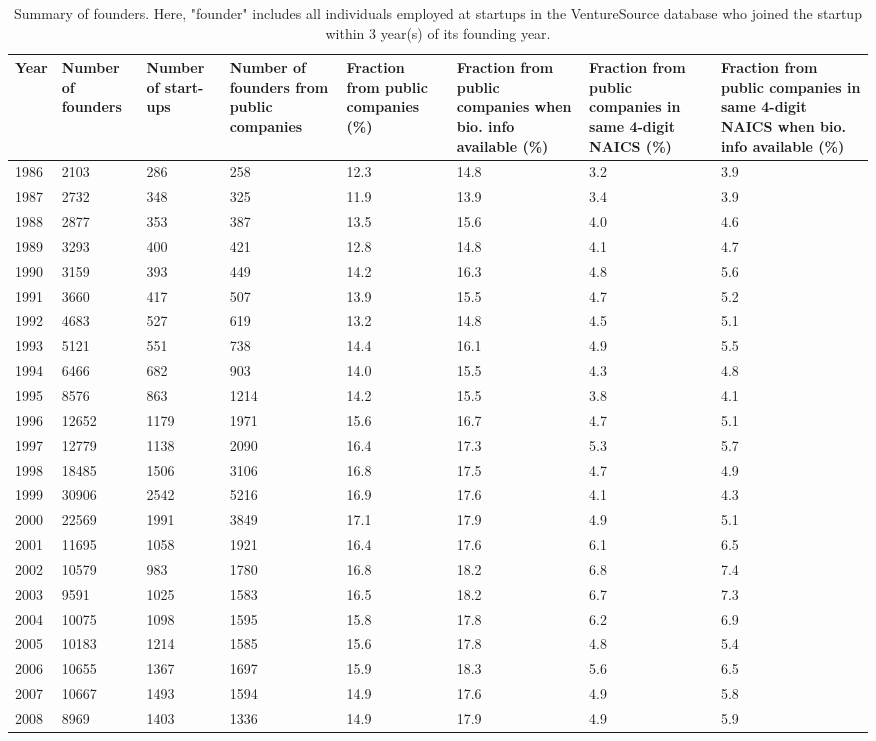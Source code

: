 \begin{table}[!htb]
\centering
\begingroup\scriptsize
\begin{tabular}{p{1.75cm}p{1.75cm}p{1.75cm}p{1.75cm}p{1.75cm}p{1.75cm}p{1.75cm}p{1.75cm}}
  \toprule
Year & Number of founders & Number of start-ups & Number of founders from public companies & Fraction from public companies (\%) & Fraction from public companies when bio. info available (\%) & Fraction from public companies in same 4-digit NAICS (\%) & Fraction from public companies in same 4-digit NAICS when bio. info available (\%) \\ 
  \midrule
1986 & 2103 & 286 & 258 & 12.3 & 14.8 & 3.2 & 3.9 \\ 
  1987 & 2732 & 348 & 325 & 11.9 & 13.9 & 3.4 & 3.9 \\ 
  1988 & 2877 & 353 & 387 & 13.5 & 15.6 & 4.0 & 4.6 \\ 
  1989 & 3293 & 400 & 421 & 12.8 & 14.8 & 4.1 & 4.7 \\ 
  1990 & 3159 & 393 & 449 & 14.2 & 16.3 & 4.8 & 5.6 \\ 
  1991 & 3660 & 417 & 507 & 13.9 & 15.5 & 4.7 & 5.2 \\ 
  1992 & 4683 & 527 & 619 & 13.2 & 14.8 & 4.5 & 5.1 \\ 
  1993 & 5121 & 551 & 738 & 14.4 & 16.1 & 4.9 & 5.5 \\ 
  1994 & 6466 & 682 & 903 & 14.0 & 15.5 & 4.3 & 4.8 \\ 
  1995 & 8576 & 863 & 1214 & 14.2 & 15.5 & 3.8 & 4.1 \\ 
  1996 & 12652 & 1179 & 1971 & 15.6 & 16.7 & 4.7 & 5.1 \\ 
  1997 & 12779 & 1138 & 2090 & 16.4 & 17.3 & 5.3 & 5.7 \\ 
  1998 & 18485 & 1506 & 3106 & 16.8 & 17.5 & 4.7 & 4.9 \\ 
  1999 & 30906 & 2542 & 5216 & 16.9 & 17.6 & 4.1 & 4.3 \\ 
  2000 & 22569 & 1991 & 3849 & 17.1 & 17.9 & 4.9 & 5.1 \\ 
  2001 & 11695 & 1058 & 1921 & 16.4 & 17.6 & 6.1 & 6.5 \\ 
  2002 & 10579 & 983 & 1780 & 16.8 & 18.2 & 6.8 & 7.4 \\ 
  2003 & 9591 & 1025 & 1583 & 16.5 & 18.2 & 6.7 & 7.3 \\ 
  2004 & 10075 & 1098 & 1595 & 15.8 & 17.8 & 6.2 & 6.9 \\ 
  2005 & 10183 & 1214 & 1585 & 15.6 & 17.8 & 4.8 & 5.4 \\ 
  2006 & 10655 & 1367 & 1697 & 15.9 & 18.3 & 5.6 & 6.5 \\ 
  2007 & 10667 & 1493 & 1594 & 14.9 & 17.6 & 4.9 & 5.8 \\ 
  2008 & 8969 & 1403 & 1336 & 14.9 & 17.9 & 4.9 & 5.9 \\ 
   \bottomrule
\end{tabular}
\endgroup
\caption{Summary of founders. Here, "founder" includes all individuals employed at startups in the VentureSource database who joined the startup within 3 year(s) of its founding year.} 
\label{table:GStable_all}
\end{table}
